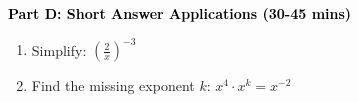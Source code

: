 \documentclass[12pt, letterpaper, fleqn]{article}
\begin{document}
\newpage

\begin{tcolorbox}[colback=customteal!20]
\large\textcolor{black}{\textbf{Part D: Short Answer Applications (30-45 mins)}}
\end{tcolorbox}

\vspace{3mm}

\begin{enumerate}[itemsep=4.2cm, leftmargin=0.6cm, resume]
\item Simplify: $\left(\frac{2}{x}\right)^{-3}$
\item Find the missing exponent $k$: $x^4 \cdot x^k = x^{-2}$
\end{enumerate}
\end{document}

